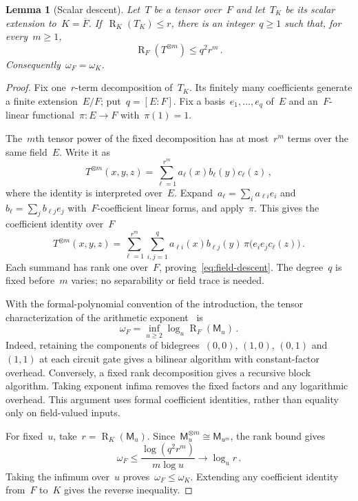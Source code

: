 \documentclass[11pt,letterpaper]{article}
\newtheorem{lemma}[theorem]{Lemma}
\theoremstyle{definition}
\numberwithin{equation}{section}
\newcommand{\MM}{\mathsf M}
\newcommand{\R}{\operatorname{R}}
\begin{document}
\begin{lemma}[Scalar descent]\label{lem:descent}
Let~$T$ be a tensor over~$F$ and let~$T_K$ be its scalar extension to~$K=\overline F$. If~$\R_K(T_K)\leq r$, there is an integer~$q\geq1$ such that, for every~$m\geq1$,
\begin{equation}\label{eq:field-descent}
 \R_F(T^{\otimes m})\leq q^2r^m\,.
\end{equation}
Consequently~$\omega_F=\omega_K$.
\end{lemma}
\begin{proof}
Fix one~$r$-term decomposition of~$T_K$. Its finitely many coefficients generate a finite extension~$E/F$; put~$q=[E:F]$. Fix a basis~$e_1,\ldots,e_q$ of~$E$ and an~$F$-linear functional~$\pi:E\to F$ with~$\pi(1)=1$.

The~$m$th tensor power of the fixed decomposition has at most~$r^m$ terms over the same field~$E$. Write it as
\begin{equation*}
 T^{\otimes m}(x,y,z)=\sum_{\ell=1}^{r^m}a_\ell(x)b_\ell(y)c_\ell(z)\,,
\end{equation*}
where the identity is interpreted over~$E$. Expand~$a_\ell=\sum_i a_{\ell i}e_i$ and~$b_\ell=\sum_j b_{\ell j}e_j$ with~$F$-coefficient linear forms, and apply~$\pi$. This gives the coefficient identity over~$F$
\begin{equation*}
 T^{\otimes m}(x,y,z)
 =\sum_{\ell=1}^{r^m}\sum_{i,j=1}^q
 a_{\ell i}(x)b_{\ell j}(y)\,
 \pi\bigl(e_i e_jc_\ell(z)\bigr)\,.
\end{equation*}
Each summand has rank one over~$F$, proving~\eqref{eq:field-descent}. The degree~$q$ is fixed before~$m$ varies; no separability or field trace is needed.

With the formal-polynomial convention of the introduction, the tensor characterization of the arithmetic exponent~\cite{BCS97} is
\begin{equation*}
 \omega_F=\inf_{u\geq2}\log_u\R_F(\MM_u)\,.
\end{equation*}
Indeed, retaining the components of bidegrees~$(0,0)$, $(1,0)$, $(0,1)$ and~$(1,1)$ at each circuit gate gives a bilinear algorithm with constant-factor overhead. Conversely, a fixed rank decomposition gives a recursive block algorithm. Taking exponent infima removes the fixed factors and any logarithmic overhead. This argument uses formal coefficient identities, rather than equality only on field-valued inputs.

For fixed~$u$, take~$r=\R_K(\MM_u)$. Since~$\MM_u^{\otimes m}\cong\MM_{u^m}$, the rank bound gives
\begin{equation*}
 \omega_F\leq\frac{\log(q^2r^m)}{m\log u}
 \longrightarrow\log_u r\,.
\end{equation*}
Taking the infimum over~$u$ proves~$\omega_F\leq\omega_K$. Extending any coefficient identity from~$F$ to~$K$ gives the reverse inequality.
\end{proof}
\end{document}
